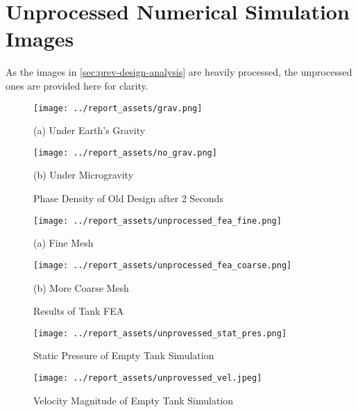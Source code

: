 \chapter{Unprocessed Numerical Simulation Images}\label{sec:unprocessed-images}
As the images in \autoref{sec:prev-design-analysis} are heavily processed, the unprocessed ones are provided here for clarity.
\begin{figure}[htbp]
    \centering

    \begin{minipage}{0.45\textwidth}
        \centering
        \texttt{[image: ../report\_assets/grav.png]}
        \caption*{(a) Under Earth's Gravity}
    \end{minipage}
    \hfill
    \begin{minipage}{0.45\textwidth}
        \centering
        \texttt{[image: ../report\_assets/no\_grav.png]}
        \caption*{(b) Under Microgravity}
    \end{minipage}
    \caption{Phase Density of Old Design after 2 Seconds}
\end{figure}

\begin{figure}[htbp]
    \centering

    \begin{minipage}{0.45\textwidth}
        \centering
        \texttt{[image: ../report\_assets/unprocessed\_fea\_fine.png]}
        \caption*{(a) Fine Mesh}
    \end{minipage}    
    \hfill
    \begin{minipage}{0.45\textwidth}
        \centering
        \texttt{[image: ../report\_assets/unprocessed\_fea\_coarse.png]}
        \caption*{(b) More Coarse Mesh}
    \end{minipage}    
    \caption{Results of Tank FEA}

\end{figure}  

\begin{figure}[htbp]
    \centering

    \begin{minipage}{0.8\textwidth}
        \centering
        \texttt{[image: ../report\_assets/unprovessed\_stat\_pres.png]}
        \caption{Static Pressure of Empty Tank Simulation}
    \end{minipage}    
\end{figure}  

\begin{figure}[htbp]
    \centering
    \begin{minipage}{0.8\textwidth}
        \centering
        \texttt{[image: ../report\_assets/unprovessed\_vel.jpeg]}
        \caption{Velocity Magnitude of Empty Tank Simulation}
    \end{minipage}    
\end{figure}  